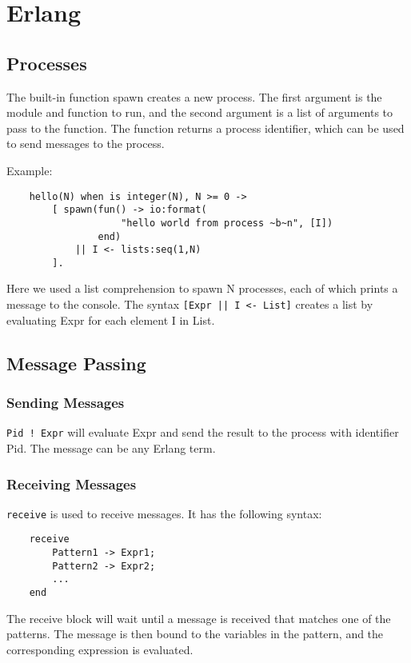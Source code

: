 \section{Erlang}

\subsection{Processes}

The built-in function spawn creates a new process. The first argument is the module and function to run, and the second argument is a list of arguments to pass to the function. The function returns a process identifier, which can be used to send messages to the process.

Example:
\begin{verbatim}
    hello(N) when is integer(N), N >= 0 ->
        [ spawn(fun() -> io:format(
                    "hello world from process ~b~n", [I])
                end)
            || I <- lists:seq(1,N)
        ].
\end{verbatim}

Here we used a list comprehension to spawn N processes, each of which prints a message to the console. The syntax \texttt{[Expr || I <- List]} creates a list by evaluating Expr for each element I in List.

\subsection{Message Passing}

\subsubsection{Sending Messages}
\texttt{Pid ! Expr} will evaluate Expr and send the result to the process with identifier Pid. The message can be any Erlang term.

\subsubsection{Receiving Messages}
\texttt{receive} is used to receive messages. It has the following syntax:
\begin{verbatim}
    receive
        Pattern1 -> Expr1;
        Pattern2 -> Expr2;
        ...
    end
\end{verbatim}

The receive block will wait until a message is received that matches one of the patterns. The message is then bound to the variables in the pattern, and the corresponding expression is evaluated.

